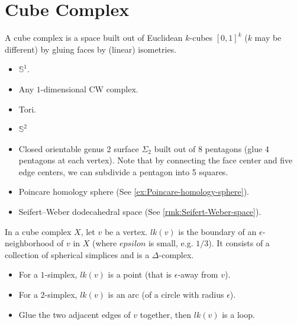 \section{Cube Complex}
\label{sec:L08-W03D2}


\begin{definition}
    \label{def:cube-complex}
    A cube complex is a space built out of Euclidean \(k\)-cubes \([0,1]^k\) (\(k\) may be different) by gluing faces by (linear) isometries.
\end{definition}

\begin{example}
    \label{ex:cube-complex}
    \begin{itemize}
        \item \(\mathbb{S}^1\).
        \item Any \(1\)-dimensional CW complex.
        \item Tori.
        \item \(\mathbb{S}^2\)
        \item Closed orientable genus 2 surface \(\Sigma_2\) built out of \(8\) pentagons (glue 4 pentagons at each vertex). Note that by connecting the face center and five edge centers, we can subdivide a pentagon into 5 squares.
        \item Poincare homology sphere (See \cref{ex:Poincare-homology-sphere}).
        \item Seifert–Weber dodecahedral space (See \cref{rmk:Seifert-Weber-space}).
    \end{itemize}
\end{example}

\begin{definition}
    \label{def:link}
    In a cube complex \(X\), let \(v\) be a vertex. \(lk(v)\) is the boundary of an \(\epsilon\)-neighborhood of \(v\) in \(X\) (where \(epsilon\) is small, e.g. \(1/3\)). It consists of a collection of spherical simplices and is a \(\Delta\)-complex.
\end{definition}

\begin{example}
    \label{ex:link-of-cube-complex}
    \begin{itemize}
        \item For a \(1\)-simplex, \(lk(v)\) is a point (that is \(\epsilon\)-away from \(v\)).
        \item For a \(2\)-simplex, \(lk(v)\) is an arc (of a circle with radius \(\epsilon\)).
        \item Glue the two adjacent edges of \(v\) together, then \(lk(v)\) is a loop.
    \end{itemize}
\end{example}

